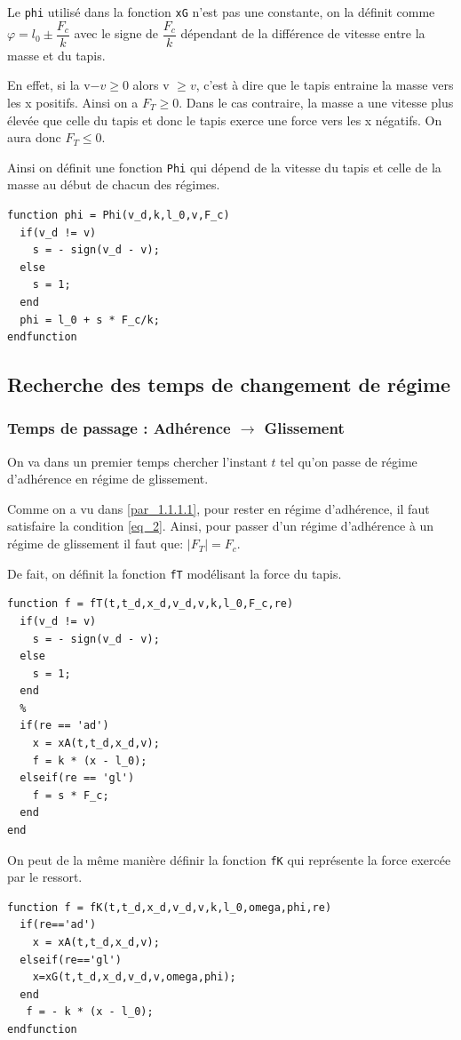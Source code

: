 \documentclass{article}
\newcommand{\ts}{\scriptscriptstyle}
\begin{document}
Le \verb|phi| utilisé dans la fonction \verb|xG| n'est pas une constante, on la définit comme $\varphi = l_0 \pm \dfrac{F_c}{k}$ avec le signe de $\dfrac{F_c}{k}$ dépendant de la différence de vitesse entre la masse et du tapis.

En effet, si la v$- v \geq 0$ alors v $\geq v$, c'est à dire que le tapis entraine la masse vers les x positifs. Ainsi on a $F_{\ts{T}}\geq0$. Dans le cas contraire, la masse a une vitesse plus élevée que celle du tapis et donc le tapis exerce une force vers les x négatifs. On aura donc $F_{\ts{T}}\leq0$.

Ainsi on définit une fonction \verb|Phi| qui dépend de la vitesse du tapis et celle de la masse au début de chacun des régimes.

\begin{lstlisting}
function phi = Phi(v_d,k,l_0,v,F_c)
  if(v_d != v)
    s = - sign(v_d - v);
  else
    s = 1;
  end
  phi = l_0 + s * F_c/k;
endfunction
\end{lstlisting}

\subsection{Recherche des temps de changement de régime}\label{ssec_2.2}
\subsubsection{Temps de passage : Adhérence $\rightarrow$ Glissement}\label{sssec_2.2.1}
On va dans un premier temps chercher l'instant $t$ tel qu'on passe de régime d'adhérence en régime de glissement. 

Comme on a vu dans \ref{par_1.1.1.1}, pour rester en régime d'adhérence, il faut satisfaire la condition \eqref{eq_2}. Ainsi, pour passer d'un régime d'adhérence à un régime de glissement il faut que: $\mid F_{\ts{T}}\mid = F_c$.

De fait, on définit la fonction \verb|fT| modélisant la force du tapis.
\begin{lstlisting}
function f = fT(t,t_d,x_d,v_d,v,k,l_0,F_c,re)
  if(v_d != v)
    s = - sign(v_d - v);
  else
    s = 1;
  end
  %
  if(re == 'ad')
    x = xA(t,t_d,x_d,v);
    f = k * (x - l_0);
  elseif(re == 'gl')
    f = s * F_c;
  end
end
\end{lstlisting}

On peut de la même manière définir la fonction \verb|fK| qui représente la force exercée par le ressort.
\begin{lstlisting}
function f = fK(t,t_d,x_d,v_d,v,k,l_0,omega,phi,re)
  if(re=='ad')
    x = xA(t,t_d,x_d,v);
  elseif(re=='gl')
    x=xG(t,t_d,x_d,v_d,v,omega,phi);
  end
   f = - k * (x - l_0);
endfunction
\end{lstlisting}
\end{document}
